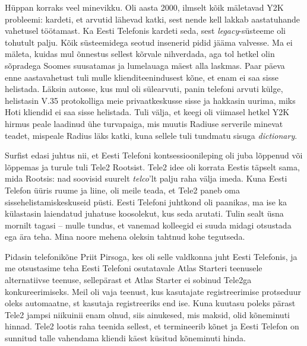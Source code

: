 Hüppan korraks veel minevikku. Oli aasta 2000, ilmselt kõik mäletavad 
Y2K probleemi: kardeti, et arvutid 
lähevad katki, sest nende kell lakkab aastatuhande vahetusel töötamast. Ka Eesti Telefonis 
kardeti seda, sest \emph{legacy}-süsteeme oli tohutult palju. Kõik süsteemidega seotud insenerid pidid jääma valvesse. Ma ei mäleta, kuidas 
mul õnnestus sellest kõrvale nihverdada, aga tol hetkel olin sõpradega Soomes 
suusatamas ja lumelauaga mäest alla laskmas. Paar päeva enne 
aastavahetust tuli mulle klienditeenindusest kõne, et enam ei saa sisse 
helistada. Läksin autosse, kus mul oli sülearvuti, panin telefoni arvuti külge, helistasin 
V.35 protokolliga meie privaatkeskusse sisse ja 
hakkasin uurima, miks Hoti kliendid ei saa sisse helistada. 
Tuli välja, et keegi oli viimasel hetkel Y2K hirmus peale laadinud ühe turvapaiga, mis muutis Radiuse serverile 
minevat teadet, mispeale Radius läks katki, kuna sellele tuli tundmatu 
sisuga \emph{dictionary}.

Surfist edasi juhtus nii, et Eesti Telefoni kontsessioonileping 
oli juba lõppenud või lõppemas ja turule tuli Tele2 Rootsist. 
Tele2 idee oli korrata Eestis täpselt sama, mida Rootsis: nad
soovisid suurelt \emph{telco}'lt palju raha välja imeda. Kuna Eesti 
Telefon üüris ruume ja liine, oli meile teada, et Tele2 paneb oma 
sissehelistamiskeskuseid püsti. Eesti Telefoni juhtkond oli paanikas, 
ma ise ka külastasin laiendatud juhatuse koosolekut, kus 
seda arutati. Tulin sealt üsna mornilt tagasi -- mulle 
tundus, et vanemad kolleegid ei suuda midagi otsustada ega ära teha. Mina 
noore mehena oleksin tahtnud kohe tegutseda. 

Pidasin telefonikõne Priit Pirsoga, kes oli selle valdkonna juht 
Eesti Telefonis, ja me otsustasime teha Eesti 
Telefoni osutatavale Atlas Starteri teenusele alternatiivse teenuse, sellepärast 
et Atlas Starter ei sobinud Tele2ga konkureerimiseks. Meil oli vaja 
teenust, kus kasutajate registreerimise protseduur oleks 
automaatne, st kasutaja registreeriks end ise. Kuna kuutasu poleks pärast Tele2 jampsi niikuinii enam olnud, siis 
ainukesed, mis maksid, olid kõneminuti hinnad. Tele2 lootis raha teenida sellest, et
termineerib kõnet ja Eesti Telefon on sunnitud talle 
vahendama kliendi käest küsitud kõneminuti hinda. 

